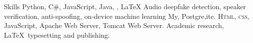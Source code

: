 
\begin{rubric}{Skills}
	Python, C\#, JavaScript, Java, , \LaTeX
\entry*[Research]
	Audio deepfake detection, speaker verification, anti-spoofing, on-device machine learning
\entry*[Databases]
	My, Postgre,ite.
	\textsc{Html, css}, JavaScript, Apache Web Server, Tomcat Web Server.
\entry*[Additional]
	Academic research, \LaTeX\ typesetting and publishing.
\end{rubric}
